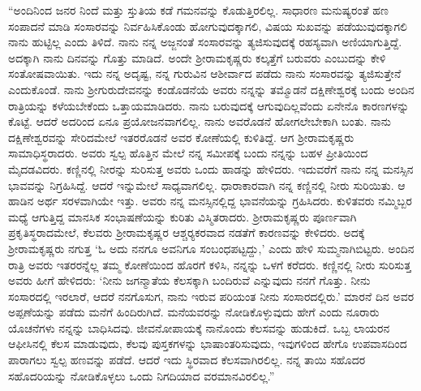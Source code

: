 “ಅಂದಿನಿಂದ ಜನರ ನಿಂದೆ ಮತ್ತು ಸ್ತುತಿಯ ಕಡೆ ಗಮನವನ್ನು ಕೊಡುತ್ತಿರಲಿಲ್ಲ. ಸಾಧಾರಣ ಮನುಷ್ಯರಂತೆ ಹಣ ಸಂಪಾದನೆ ಮಾಡಿ ಸಂಸಾರವನ್ನು ನಿರ್ವಹಿಸಿಕೊಂಡು ಹೋಗುವುದಕ್ಕಾಗಲಿ, ವಿಷಯ ಸುಖವನ್ನು ಪಡೆಯುವುದಕ್ಕಾಗಲಿ ನಾನು ಹುಟ್ಟಿಲ್ಲ ಎಂದು ತಿಳಿದೆ. ನಾನು ನನ್ನ ಅಜ್ಜನಂತೆ ಸಂಸಾರವನ್ನು ತ್ಯಜಿಸುವುದಕ್ಕೆ ರಹಸ್ಯವಾಗಿ ಅಣಿಯಾಗುತ್ತಿದ್ದೆ. ಅದಕ್ಕಾಗಿ ನಾನು ದಿನವನ್ನು ಗೊತ್ತು ಮಾಡಿದೆ. ಅಂದೇ ಶ‍್ರೀರಾಮಕೃಷ್ಣರು ಕಲ್ಕತ್ತೆಗೆ ಬರುವರು ಎಂಬುದನ್ನು ಕೇಳಿ ಸಂತೋಷವಾಯಿತು. ಇದು ನನ್ನ ಅದೃಷ್ಟ, ನನ್ನ ಗುರುವಿನ ಆಶೀರ್ವಾದ ಪಡೆದು ನಾನು ಸಂಸಾರವನ್ನು ತ್ಯಜಿಸುತ್ತೇನೆ ಎಂದುಕೊಂಡೆ. ನಾನು ಶ‍್ರೀಗುರುದೇವನನ್ನು ಕಂಡೊಡನೆಯೆ ಅವರು ನನ್ನನ್ನು ತಮ್ಮೊಡನೆ ದಕ್ಷಿಣೇಶ್ವರಕ್ಕೆ ಬಂದು ಅಂದಿನ ರಾತ್ರಿಯನ್ನು ಕಳೆಯಬೇಕೆಂದು ಒತ್ತಾಯಮಾಡಿದರು. ನಾನು ಬರುವುದಕ್ಕೆ ಆಗುವುದಿಲ್ಲವೆಂದು ಏನೇನೊ ಕಾರಣಗಳನ್ನು ಕೊಟ್ಟೆ. ಆದರೆ ಅದರಿಂದ ಏನೂ ಪ್ರಯೋಜನವಾಗಲಿಲ್ಲ. ನಾನು ಅವರೊಡನೆ ಹೋಗಲೇಬೇಕಾಗಿ ಬಂತು. ನಾನು ದಕ್ಷಿಣೇಶ್ವರವನ್ನು ಸೇರಿದಮೇಲೆ ಇತರರೊಡನೆ ಅವರ ಕೋಣೆಯಲ್ಲಿ ಕುಳಿತಿದ್ದೆ. ಆಗ ಶ‍್ರೀರಾಮಕೃಷ್ಣರು ಸಾಮಾಧಿಸ್ಥರಾದರು. ಅವರು ಸ್ವಲ್ಪ ಹೊತ್ತಿನ ಮೇಲೆ ನನ್ನ ಸಮೀಪಕ್ಕೆ ಬಂದು ನನ್ನನ್ನು ಬಹಳ ಪ್ರೀತಿಯಿಂದ ಮೈದಡವಿದರು. ಕಣ್ಣಿನಲ್ಲಿ ನೀರನ್ನು ಸುರಿಸುತ್ತ ಅವರು ಒಂದು ಹಾಡನ್ನು ಹೇಳಿದರು. ಇದುವರೆಗೆ ನಾನು ನನ್ನ ಮನಸ್ಸಿನ ಭಾವವನ್ನು ನಿಗ್ರಹಿಸಿದ್ದೆ. ಆದರೆ ಇನ್ನುಮೇಲೆ ಸಾಧ್ಯವಾಗಲಿಲ್ಲ. ಧಾರಾಕಾರವಾಗಿ ನನ್ನ ಕಣ್ಣಿನಲ್ಲಿ ನೀರು ಸುರಿಯಿತು. ಆ ಹಾಡಿನ ಅರ್ಥ ಸರಳವಾಗಿಯೇ ಇತ್ತು. ಅವರು ನನ್ನ ಮನಸ್ಸಿನಲ್ಲಿದ್ದ ಭಾವನೆಯನ್ನು ಗ್ರಹಿಸಿದರು. ಕುಳಿತವರು ನಮ್ಮಿಬ್ಬರ ಮಧ್ಯೆ ಆಗುತ್ತಿದ್ದ ಮಾನಸಿಕ ಸಂಭಾಷಣೆಯನ್ನು ಕುರಿತು ವಿಸ್ಮಿತರಾದರು. ಶ‍್ರೀರಾಮಕೃಷ್ಣರು ಪೂರ್ಣವಾಗಿ ಪ್ರಕೃತಿಸ್ಥರಾದಮೇಲೆ, ಕೆಲವರು ಶ‍್ರೀರಾಮಕೃಷ್ಣರ ಆಶ್ಚರ‍್ಯಕರವಾದ ನಡತೆಗೆ ಕಾರಣವನ್ನು ಕೇಳಿದರು. ಅದಕ್ಕೆ ಶ‍್ರೀರಾಮಕೃಷ್ಣರು ನಗುತ್ತ ‘ಓ ಅದು ನನಗೂ ಅವನಿಗೂ ಸಂಬಂಧಪಟ್ಟದ್ದು,’ ಎಂದು ಹೇಳಿ ಸುಮ್ಮನಾಗಿಬಿಟ್ಟರು. ಅಂದಿನ ರಾತ್ರಿ ಅವರು ಇತರರನ್ನೆಲ್ಲ ತಮ್ಮ ಕೋಣೆಯಿಂದ ಹೊರಗೆ ಕಳಿಸಿ, ನನ್ನನ್ನು ಒಳಗೆ ಕರೆದರು. ಕಣ್ಣಿನಲ್ಲಿ ನೀರು ಸುರಿಸುತ್ತ ಅವರು ಹೀಗೆ ಹೇಳಿದರು: ‘ನೀನು ಜಗನ್ಮಾತೆಯ ಕೆಲಸಕ್ಕಾಗಿ ಬಂದಿರುವೆ ಎನ್ನುವುದು ನನಗೆ ಗೊತ್ತು. ನೀನು ಸಂಸಾರದಲ್ಲಿ ಇರಲಾರೆ, ಆದರೆ ನನಗೊಸುಗ, ನಾನು ಇರುವ ಪರಿಯಂತ ನೀನು ಸಂಸಾರದಲ್ಲಿರು.’ ಮಾರನೆ ದಿನ ಅವರ ಅಪ್ಪಣೆಯನ್ನು ಪಡೆದು ಮನೆಗೆ ಹಿಂದಿರುಗಿದೆ. ಮನೆಯವರನ್ನು ನೋಡಿಕೊಳ್ಳುವುದು ಹೇಗೆ ಎಂದು ನೂರಾರು ಯೊಚನೆಗಳು ನನ್ನನ್ನು ಬಾಧಿಸಿದವು. ಜೀವನೋಪಾಯಕ್ಕೆ ನಾನೊಂದು ಕೆಲಸವನ್ನು ಹುಡುಕಿದೆ. ಒಬ್ಬ ಲಾಯರನ ಆಫೀಸಿನಲ್ಲಿ ಕೆಲಸ ಮಾಡುವುದು, ಕೆಲವು ಪುಸ್ತಕಗಳನ್ನು ಭಾಷಾಂತರಿಸುವುದು, ಇವುಗಳಿಂದ ಹೇಗೊ ಉಪವಾಸದಿಂದ ಪಾರಾಗಲು ಸ್ವಲ್ಪ ಹಣವನ್ನು ಪಡೆದೆ. ಆದರೆ ಇದು ಸ್ಥಿರವಾದ ಕೆಲಸವಾಗಿರಲಿಲ್ಲ. ನನ್ನ ತಾಯಿ ಸಹೊದರ ಸಹೊದರಿಯನ್ನು ನೋಡಿಕೊಳ್ಳಲು ಒಂದು ನಿಗದಿಯಾದ ವರಮಾನವಿರಲಿಲ್ಲ.”

